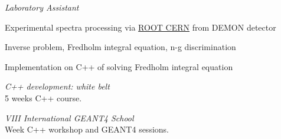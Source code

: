 \documentclass[
  a4paper, 
   maincolor=cvblue,
   sectioncolor=cvblue,
]{fortysecondscv}
\begin{document}
\begin{cvtable}
	{\footnotesize\textit{Laboratory Assistant}
	\normalsize
	\begin{itemize-noindent}
		\item Experimental spectra processing via \href{https://root.cern/}{ROOT CERN} from DEMON detector
		\item Inverse problem, Fredholm integral equation, n-g discrimination
		\item Implementation on C++ of solving Fredholm integral equation
	\end{itemize-noindent}
	}
	
\end{cvtable}

\begin{cvtable}
		{
		\footnotesize\textit{C++ development: white belt} \\
		\normalsize
		5 weeks C++ course. \\
		 
		 
		}

		{
		\footnotesize\textit{VIII International GEANT4 School} \\
		\normalsize
		Week C++ workshop and GEANT4 sessions. \\
		 
		}
\end{cvtable}
\end{document}
